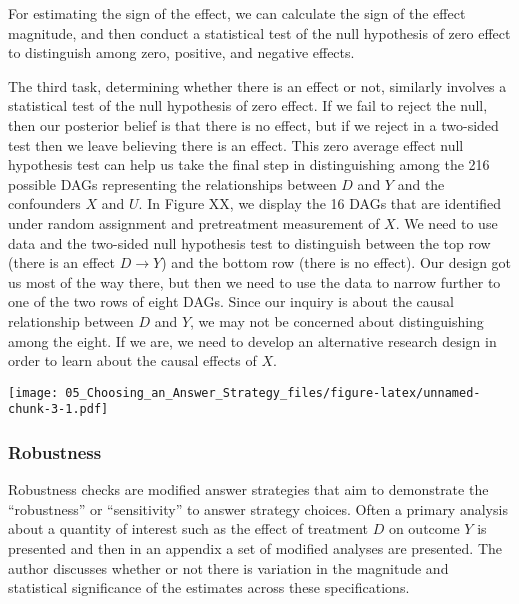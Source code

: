 \documentclass[
]{article}
\begin{document}
For estimating the sign of the effect, we can calculate the sign of the
effect magnitude, and then conduct a statistical test of the null
hypothesis of zero effect to distinguish among zero, positive, and
negative effects.

The third task, determining whether there is an effect or not, similarly
involves a statistical test of the null hypothesis of zero effect. If we
fail to reject the null, then our posterior belief is that there is no
effect, but if we reject in a two-sided test then we leave believing
there is an effect. This zero average effect null hypothesis test can
help us take the final step in distinguishing among the 216 possible
DAGs representing the relationships between \(D\) and \(Y\) and the
confounders \(X\) and \(U\). In Figure XX, we display the 16 DAGs that
are identified under random assignment and pretreatment measurement of
\(X\). We need to use data and the two-sided null hypothesis test to
distinguish between the top row (there is an effect \(D\rightarrow Y\))
and the bottom row (there is no effect). Our design got us most of the
way there, but then we need to use the data to narrow further to one of
the two rows of eight DAGs. Since our inquiry is about the causal
relationship between \(D\) and \(Y\), we may not be concerned about
distinguishing among the eight. If we are, we need to develop an
alternative research design in order to learn about the causal effects
of \(X\).

\texttt{[image: 05\_Choosing\_an\_Answer\_Strategy\_files/figure-latex/unnamed-chunk-3-1.pdf]}

\hypertarget{robustness}{%
\subsubsection{Robustness}\label{robustness}}

Robustness checks are modified answer strategies that aim to demonstrate
the ``robustness'' or ``sensitivity'' to answer strategy choices. Often
a primary analysis about a quantity of interest such as the effect of
treatment \(D\) on outcome \(Y\) is presented and then in an appendix a
set of modified analyses are presented. The author discusses whether or
not there is variation in the magnitude and statistical significance of
the estimates across these specifications.
\end{document}
